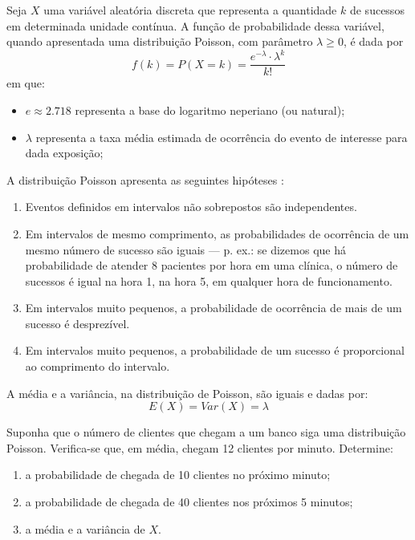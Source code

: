 Seja $X$ uma variável aleatória discreta que representa a quantidade $k$ de
sucessos em determinada unidade contínua. A função de probabilidade dessa
variável, quando apresentada uma distribuição Poisson, com parâmetro
$\lambda \geq 0$, é dada por
\begin{equation}
    f(k) = P(X=k) = \frac{e^{-\lambda} \cdot \lambda^{k}}{k!}
    \label{eq:dist-poisson}
\end{equation}
em que:
\begin{itemize}
    \item $e \approx 2.718$ representa a base do logaritmo neperiano (ou natural);
    \item $\lambda$ representa a taxa média estimada de ocorrência do evento de
    interesse para dada exposição;
\end{itemize}

A distribuição Poisson apresenta as seguintes hipóteses
\parencite[p.~324]{favero}:
\begin{enumerate}[label=\Roman*)]
    \item Eventos definidos em intervalos não sobrepostos são independentes.
    \item Em intervalos de mesmo comprimento, as probabilidades de ocorrência
    de um mesmo número de sucesso são iguais --- p. ex.: se dizemos que há
    probabilidade de atender 8 pacientes por hora em uma clínica, o número de
    sucessos é igual na hora 1, na hora 5, em qualquer hora de funcionamento.
    \item Em intervalos muito pequenos, a probabilidade de ocorrência de mais de um sucesso é desprezível.
    \item Em intervalos muito pequenos, a probabilidade de um sucesso é proporcional ao comprimento do intervalo.
\end{enumerate}

A média e a variância, na distribuição de Poisson, são iguais e dadas por:
\begin{equation}
    E(X) = Var(X) = \lambda
\end{equation}

\begin{eg}
Suponha que o número de clientes que chegam a um banco siga uma distribuição
Poisson. Verifica-se que, em média, chegam 12 clientes por minuto. Determine:
\begin{enumerate}[label=\alph*)]
    \item a probabilidade de chegada de 10 clientes no próximo minuto;
    \item a probabilidade de chegada de 40 clientes nos próximos 5 minutos;
    \item a média e a variância de $X$.
\end{enumerate}
\end{eg}

